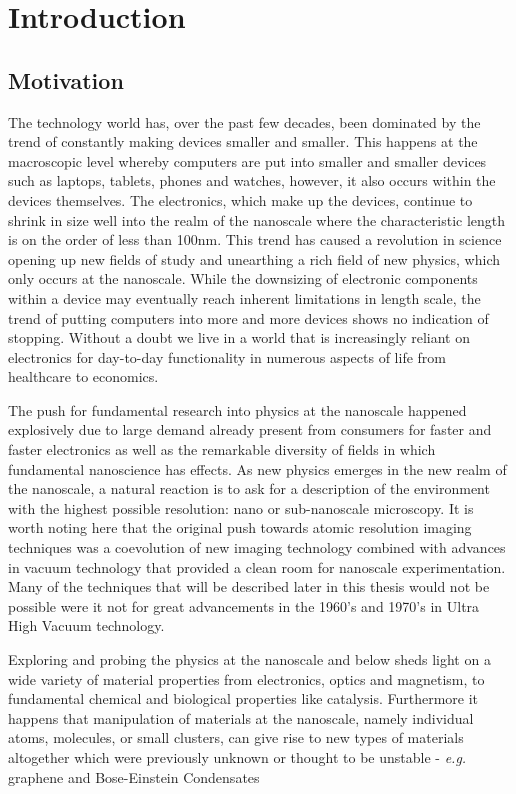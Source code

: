 \chapter{\sc Introduction}
\label{ch:Introduction}

\section{Motivation}
The technology world has, over the past few decades, been dominated by the trend of constantly making devices smaller and smaller.  This happens at the macroscopic level whereby computers are put into smaller and smaller devices such as laptops, tablets, phones and watches, however, it also occurs within the devices themselves. The electronics, which make up the devices, continue to shrink in size well into the realm of the nanoscale where the characteristic length is on the order of less than 100nm. This trend has caused a revolution in science opening up new fields of study and unearthing a rich field of new physics, which only occurs at the nanoscale. While the downsizing of electronic components within a device may eventually reach inherent limitations in length scale, the trend of putting computers into more and more devices shows no indication of stopping. Without a doubt we live in a world that is increasingly reliant on electronics for day-to-day functionality in numerous aspects of life from healthcare to economics.

The push for fundamental research into physics at the nanoscale happened explosively due to large demand already present from consumers for faster and faster electronics as well as the remarkable diversity of fields in which fundamental nanoscience has effects. As new physics emerges in the new realm of the nanoscale, a natural reaction is to ask for a description of the environment with the highest possible resolution: nano or sub-nanoscale microscopy. It is worth noting here that the original push towards atomic resolution imaging techniques was a coevolution of new imaging technology combined with advances in vacuum technology that provided a clean room for nanoscale experimentation. Many of the techniques that will be described later in this thesis would not be possible were it not for great advancements in the 1960's and 1970's in Ultra High Vacuum technology.

Exploring and probing the physics at the nanoscale and below sheds light on a wide variety of material properties from electronics, optics and magnetism, to fundamental chemical and biological properties like catalysis. Furthermore it happens that manipulation of materials at the nanoscale, namely individual atoms, molecules, or small clusters, can give rise to new types of materials altogether which were previously unknown or thought to be unstable - \emph{e.g.} graphene and Bose-Einstein Condensates

